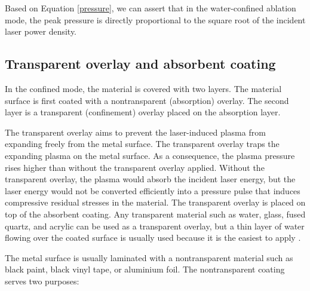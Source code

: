 Based on Equation \ref{pressure}, we can assert that in the water-confined ablation mode, the peak pressure is directly proportional to the square root of the incident laser power density.

\subsection{Transparent overlay and absorbent coating}

In the confined mode, the material is covered with two layers. The material surface is first coated with a nontransparent (absorption) overlay. The second layer is a transparent (confinement) overlay placed on the absorption layer.

The transparent overlay aims to prevent the laser-induced plasma from expanding freely from the metal surface.  The transparent overlay traps the expanding plasma on the metal surface. As a consequence, the plasma pressure rises higher than without the transparent overlay applied. Without the transparent overlay, the plasma would absorb the incident laser energy, but the laser energy would not be converted efficiently into a pressure pulse that induces compressive residual stresses in the material. The transparent overlay is placed on top of the absorbent coating. Any transparent material such as water, glass, fused quartz, and acrylic can be used as a transparent overlay, but a thin layer of water flowing over the coated surface is usually used because it is the easiest to apply \cite{clauer_lahrman_2001}.

The metal surface is usually laminated with a nontransparent material such as black paint, black vinyl tape, or aluminium foil. The nontransparent coating serves two purposes:

